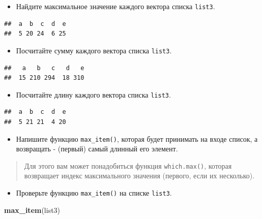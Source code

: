 \documentclass[]{book}
\newenvironment{Shaded}{\begin{snugshade}}{\end{snugshade}}
\newcommand{\KeywordTok}[1]{\textcolor[rgb]{0.13,0.29,0.53}{\textbf{#1}}}
\newcommand{\NormalTok}[1]{#1}
\providecommand{\tightlist}{%
  \setlength{\itemsep}{0pt}\setlength{\parskip}{0pt}}
\begin{document}
\begin{itemize}
\tightlist
\item
  Найдите максимальное значение каждого вектора списка \texttt{list3}.
\end{itemize}

\begin{verbatim}
##  a  b  c  d  e 
##  5 20 24  6 25
\end{verbatim}

\begin{itemize}
\tightlist
\item
  Посчитайте сумму каждого вектора списка \texttt{list3}.
\end{itemize}

\begin{verbatim}
##   a   b   c   d   e 
##  15 210 294  18 310
\end{verbatim}

\begin{itemize}
\tightlist
\item
  Посчитайте длину каждого вектора списка \texttt{list3}.
\end{itemize}

\begin{verbatim}
##  a  b  c  d  e 
##  5 21 21  4 20
\end{verbatim}

\begin{itemize}
\tightlist
\item
  Напишите функцию \texttt{max\_item()}, которая будет принимать на
  входе список, а возвращать - (первый) самый длинный его элемент.
\end{itemize}

\begin{quote}
Для этого вам может понадобиться функция \texttt{which.max()}, которая
возвращает индекс максимального значения (первого, если их несколько).
\end{quote}

\begin{itemize}
\tightlist
\item
  Проверьте функцию \texttt{max\_item()} на списке \texttt{list3}.
\end{itemize}

\begin{Shaded}
\begin{Highlighting}[]
\KeywordTok{max_item}\NormalTok{(list3)}
\end{Highlighting}
\end{Shaded}
\end{document}
